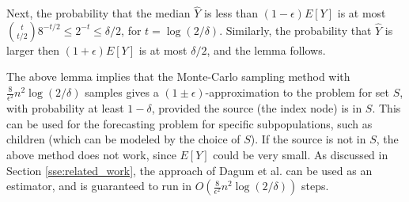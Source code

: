 Next, the probability that the median $\hat{Y}$ is less than
$(1-\epsilon)E[Y]$ is at most ${t \choose t/2} 8^{-t/2}\leq
2^{-t}\leq \delta/2$, for $t=\log{(2/\delta)}$.  Similarly, the
probability that $\hat{Y}$ is larger then $(1+\epsilon)E[Y]$
is at most $\delta/2$, and the lemma follows. \QED

The above lemma implies that the Monte-Carlo sampling method 
with $\frac{8}{\epsilon^2}n^2\log{(2/\delta)}$ samples gives a
$(1\pm\epsilon)$-approximation to the \tTotInfs{} problem for set $S$, with
probability at least $1-\delta$, provided the source (the index node) is in $S$.
This can be used for the forecasting problem for specific subpopulations, such
as children (which can be modeled by the choice of $S$). If the source is not
in $S$, the above method does not work, since $E[Y]$ could be very small.
As discussed in Section \ref{sse:related_work}, the approach of
Dagum et al. \cite{dagum:focs95} can be used as an estimator, and is
guaranteed to run in $O(\frac{8}{\epsilon^2}n^2\log{(2/\delta)})$ steps.
